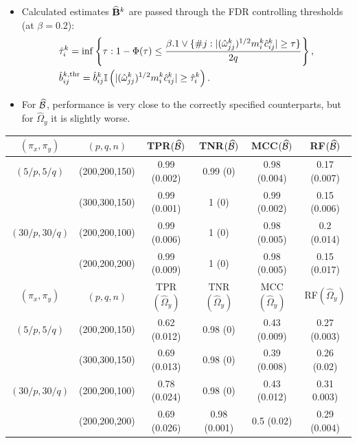 \documentclass[landscape,a0paper,fontscale=0.4]{baposter} %
\begin{document}
\begin{poster}
{{\begin{itemize}[leftmargin=*]
\item Calculated estimates $\widehat {{\mathbf{B}}}^k$ are passed through the FDR controlling thresholds (at $\beta = 0.2$):
%
\begin{align*}
& \hat \tau_i^k = \inf \left\{\tau : 1 - \Phi(\tau) \leq
\frac{\beta. 1 \vee \{ \# j: |(\hat \omega_{jj}^k)^{1/2} m_i^k \hat c_{ij}^k| \geq \tau \} }{2 q}
\right\},\\
& \hat b_{ij}^{k, \text{thr}} =  \hat b_{ij}^k {\mathbb{I}} \left(
| (\hat \omega_{jj}^k)^{1/2} m_i^k \hat c_{ij}^k | \geq \hat \tau_i^k \right).
\end{align*}
%
\item For $\widehat {{\cal{B}}}$, performance is very close to the correctly specified counterparts, but for $\widehat \Omega_y$ it is slightly worse.
\end{itemize}
}
%
\parbox{.59\textwidth}{
\centering
\fontsize{9}{10}
\selectfont
\begin{tabular}{cccccc}
\hline
$(\pi_x, \pi_y)$ & $(p,q,n)$   & TPR$(\widehat {{\cal{B}}})$            & TNR$(\widehat {{\cal{B}}})$             & MCC$(\widehat {{\cal{B}}})$ & RF$(\widehat {{\cal{B}}})$    \\ \hline
    $(5/p, 5/q)$   & (200,200,150) & 0.99 (0.002)  & 0.99 (0)       & 0.98 (0.004)  & 0.17 (0.007) \\
    ~              & (300,300,150) & 0.99 (0.001)  & 1 (0)          & 0.99 (0.002)  & 0.15 (0.006) \\
    $(30/p, 30/q)$ & (200,200,100) & 0.99 (0.006)  & 1 (0)          & 0.98 (0.005)  & 0.2 (0.014)  \\
    ~              & (200,200,200) & 0.99 (0.009)  & 1 (0)          & 0.98 (0.005)  & 0.15 (0.017) \\\hline
    \hline
    $(\pi_x, \pi_y)$ & $(p,q,n)$   & TPR$(\widehat \Omega_y)$            & TNR$(\widehat \Omega_y)$             & MCC$(\widehat \Omega_y)$ & RF$(\widehat \Omega_y)$            \\ \hline
    $(5/p, 5/q)$   & (200,200,150) & 0.62 (0.012)  & 0.98 (0)       & 0.43 (0.009)  & 0.27 (0.003)\\
    ~              & (300,300,150) & 0.69 (0.013)  & 0.98 (0)       & 0.39 (0.008)  & 0.26 (0.02) \\
    $(30/p, 30/q)$ & (200,200,100) & 0.78 (0.024)  & 0.98 (0)       & 0.43 (0.012)  & 0.31 0.003) \\
    ~              & (200,200,200) & 0.69 (0.026)  & 0.98 (0.001)   & 0.5 (0.02)    & 0.29 (0.004)\\\hline
\end{tabular}
}

}
\end{poster}
\end{document}
